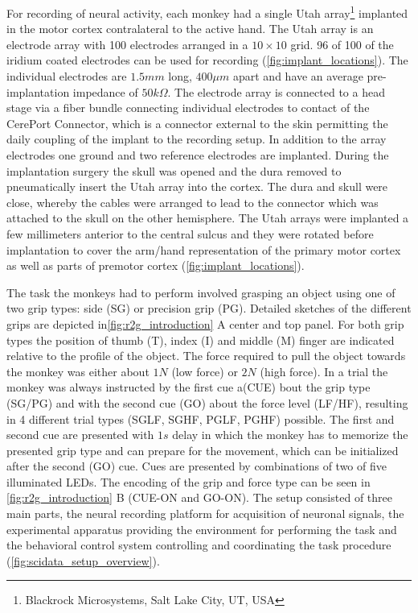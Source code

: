 For recording of neural activity, each monkey had a single Utah array\footnote{Blackrock Microsystems, Salt Lake City, UT, USA} implanted in the motor cortex contralateral to the active hand. The Utah array is an electrode array with 100 electrodes arranged in a $10\times10$ grid. 96 of 100 of the iridium coated electrodes can be used for recording (\cref{fig:implant_locations}). The individual electrodes are $1.5mm$ long, $400\mu m$ apart and have an average pre-implantation impedance of $50k\Omega$. The electrode array is connected to a head stage via a fiber bundle connecting individual electrodes to contact of the CerePort Connector, which is a connector external to the skin permitting the daily coupling of the implant to the recording setup. In addition to the array electrodes one ground and two reference electrodes are implanted. During the implantation surgery the skull was opened and the dura removed to pneumatically insert the Utah array into the cortex. The dura and skull were close, whereby the cables were arranged to lead to the connector which was attached to the skull on the other hemisphere. The Utah arrays were implanted a few millimeters anterior to the central sulcus and they were rotated before implantation to cover the arm/hand representation of the primary motor cortex as well as parts of premotor cortex (\cref{fig:implant_locations}).

The task the monkeys had to perform involved grasping an object using one of two grip types: side (SG) or precision grip (PG). Detailed sketches of the different grips are depicted in\cref{fig:r2g_introduction} A center and top panel. For both grip types the position of thumb (T), index (I) and middle (M) finger are indicated relative to the profile of the object. The force required to pull the object towards the monkey was either about $1N$ (low force) or $2N$ (high force).  In a trial the monkey was always instructed by the first cue a(CUE) bout the grip type (SG/PG) and with the second cue (GO) about the force level (LF/HF), resulting in 4 different trial types (SGLF, SGHF, PGLF, PGHF) possible. The first and second cue are presented with $1s$ delay in which the monkey has to memorize the presented grip type and can prepare for the movement, which can be initialized after the second (GO) cue. Cues are presented by combinations of two of five illuminated LEDs. The encoding of the grip and force type can be seen in \cref{fig:r2g_introduction} B (CUE-ON and GO-ON). The setup consisted of three main parts, the neural recording platform for acquisition of neuronal signals, the experimental apparatus providing the environment for performing the task and the behavioral control system controlling and coordinating the task procedure (\cref{fig:scidata_setup_overview}).

